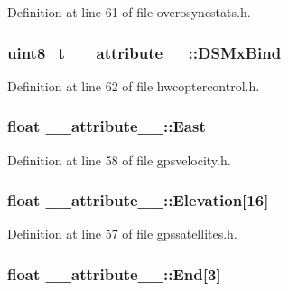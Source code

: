 \-Definition at line 61 of file overosyncstats.\-h.

\hypertarget{struct____attribute_____a7a1c123b0c3f382a751e0ac89b911028}{
\subsubsection[{\-D\-S\-Mx\-Bind}]{\setlength{\rightskip}{0pt plus 5cm}uint8\-\_\-t {\bf \-\_\-\-\_\-attribute\-\_\-\-\_\-\-::\-D\-S\-Mx\-Bind}}}\label{struct____attribute_____a7a1c123b0c3f382a751e0ac89b911028}


\-Definition at line 62 of file hwcoptercontrol.\-h.

\hypertarget{struct____attribute_____a344a295af71bb400fd8a8ed79f82a00a}{
\subsubsection[{\-East}]{\setlength{\rightskip}{0pt plus 5cm}float {\bf \-\_\-\-\_\-attribute\-\_\-\-\_\-\-::\-East}}}\label{struct____attribute_____a344a295af71bb400fd8a8ed79f82a00a}


\-Definition at line 58 of file gpsvelocity.\-h.

\hypertarget{struct____attribute_____a4406262a239d19bd6ed0eadd427c2bbb}{
\subsubsection[{\-Elevation}]{\setlength{\rightskip}{0pt plus 5cm}float {\bf \-\_\-\-\_\-attribute\-\_\-\-\_\-\-::\-Elevation}\mbox{[}16\mbox{]}}}\label{struct____attribute_____a4406262a239d19bd6ed0eadd427c2bbb}


\-Definition at line 57 of file gpssatellites.\-h.

\hypertarget{struct____attribute_____a3939b85f1071eb03c02715f5f63c12a4}{
\subsubsection[{\-End}]{\setlength{\rightskip}{0pt plus 5cm}float {\bf \-\_\-\-\_\-attribute\-\_\-\-\_\-\-::\-End}\mbox{[}3\mbox{]}}}\label{struct____attribute_____a3939b85f1071eb03c02715f5f63c12a4}


